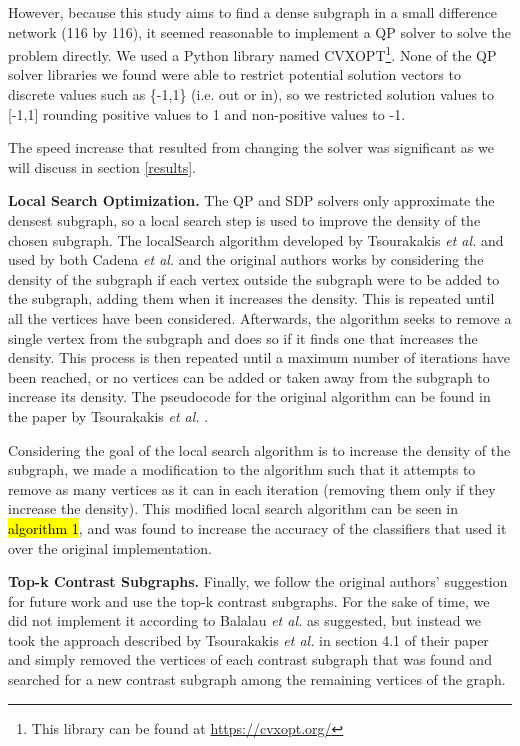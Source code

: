 \documentclass[sigconf]{acmart}
\begin{document}
However, because this study aims to find a dense subgraph in a small difference network (116 by 116), it seemed reasonable to implement a QP solver to solve the problem directly.
We used a Python library named CVXOPT\footnote{This library can be found at \url{https://cvxopt.org/}}.
None of the QP solver libraries we found were able to restrict potential solution vectors to discrete values such as \{-1,1\} (i.e. out or in), so we restricted solution values to [-1,1] rounding positive values to 1 and non-positive values to -1.

The speed increase that resulted from changing the solver was significant as we will discuss in section \ref{results}.

\textbf{Local Search Optimization.}
The QP and SDP solvers only approximate the densest subgraph, so a local search step is used to improve the density of the chosen subgraph.
The localSearch algorithm developed by Tsourakakis \emph{et al.} \cite{tsourakakis2013} and used by both Cadena \emph{et al.} and the original authors works by considering the density of the subgraph if each vertex outside the subgraph were to be added to the subgraph, adding them when it increases the density.
This is repeated until all the vertices have been considered.
Afterwards, the algorithm seeks to remove a single vertex from the subgraph and does so if it finds one that increases the density.
This process is then repeated until a maximum number of iterations have been reached, or no vertices can be added or taken away from the subgraph to increase its density.
The pseudocode for the original algorithm can be found in the paper by Tsourakakis \emph{et al.} \cite{tsourakakis2013}.

Considering the goal of the local search algorithm is to increase the density of the subgraph, we made a modification to the algorithm such that it attempts to remove as many vertices as it can in each iteration (removing them only if they increase the density).
This modified local search algorithm can be seen in \hl{algorithm 1}, and was found to increase the accuracy of the classifiers that used it over the original implementation.

\textbf{Top-k Contrast Subgraphs.}
Finally, we follow the original authors' suggestion for future work and use the top-k contrast subgraphs.
For the sake of time, we did not implement it according to Balalau \emph{et al.} \cite{balalau2015} as suggested, but instead we took the approach described by Tsourakakis \emph{et al.} in section 4.1 of their paper \cite{tsourakakis2013} and simply removed the vertices of each contrast subgraph that was found and searched for a new contrast subgraph among the remaining vertices of the graph.
\end{document}
